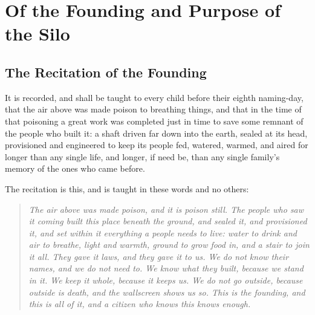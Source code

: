 \chapter{Of the Founding and Purpose of the Silo}
\label{art:founding}


\section{The Recitation of the Founding}
\label{sec:founding:recitation-of-the-founding}

It is recorded, and shall be taught to every child before their eighth naming-day, that the air above was made poison to breathing things, and that in the time of that poisoning a great work was completed just in time to save some remnant of the people who built it: a shaft driven far down into the earth, sealed at its head, provisioned and engineered to keep its people fed, watered, warmed, and aired for longer than any single life, and longer, if need be, than any single family's memory of the ones who came before.

The recitation is this, and is taught in these words and no others:

\begin{quote}
\itshape
The air above was made poison, and it is poison still. The people who saw it coming built this place beneath the ground, and sealed it, and provisioned it, and set within it everything a people needs to live: water to drink and air to breathe, light and warmth, ground to grow food in, and a stair to join it all. They gave it laws, and they gave it to us. We do not know their names, and we do not need to. We know what they built, because we stand in it. We keep it whole, because it keeps us. We do not go outside, because outside is death, and the wallscreen shows us so. This is the founding, and this is all of it, and a citizen who knows this knows enough.
\end{quote}

